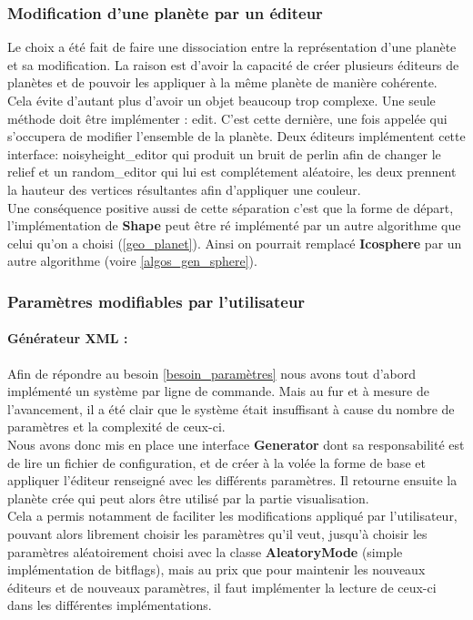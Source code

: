 \documentclass[a4paper]{article}
\begin{document}
\subsubsection{Modification d'une planète par un éditeur}
Le choix a été fait de faire une dissociation entre la représentation d'une planète et sa modification. La raison est d'avoir la capacité de créer plusieurs éditeurs de planètes et de pouvoir les appliquer à la même planète de manière cohérente. Cela évite d'autant plus d'avoir un objet beaucoup trop complexe. Une seule méthode doit être implémenter : edit. C'est cette dernière, une fois appelée qui s'occupera de modifier l'ensemble de la planète. Deux éditeurs implémentent cette interface: noisyheight\_editor qui produit un bruit de perlin afin de changer le relief et un random\_editor qui lui est complétement aléatoire, les deux prennent la hauteur des vertices résultantes afin d'appliquer une couleur.\\
Une conséquence positive aussi de cette séparation c'est que la forme de départ, l'implémentation de \textbf{Shape} peut être ré implémenté par un autre algorithme que celui qu'on a choisi (\ref{geo_planet}). Ainsi on pourrait remplacé \textbf{Icosphere} par un autre algorithme (voire \ref{algos_gen_sphere}).\\

\subsubsection{Paramètres modifiables par l'utilisateur}

\paragraph{Générateur XML :}
Afin de répondre au besoin \ref{besoin_paramètres} nous avons tout d'abord implémenté un système par ligne de commande. Mais au fur et à mesure de l'avancement, il a été clair que le système était insuffisant à cause du nombre de paramètres et la complexité de ceux-ci.\\
Nous avons donc mis en place une interface \textbf{Generator} dont sa responsabilité est de lire un fichier de configuration, et de créer à la volée la forme de base et appliquer l'éditeur renseigné avec les différents paramètres.
Il retourne ensuite la planète crée qui peut alors être utilisé par la partie visualisation.\\
Cela a permis notamment de faciliter les modifications appliqué par l'utilisateur, pouvant alors librement choisir les paramètres qu'il veut, jusqu'à choisir les paramètres aléatoirement choisi avec la classe \textbf{AleatoryMode} (simple implémentation de bitflags), mais au prix que pour maintenir les nouveaux éditeurs et de nouveaux paramètres, il faut implémenter la lecture de ceux-ci dans les différentes implémentations.\\
\end{document}
